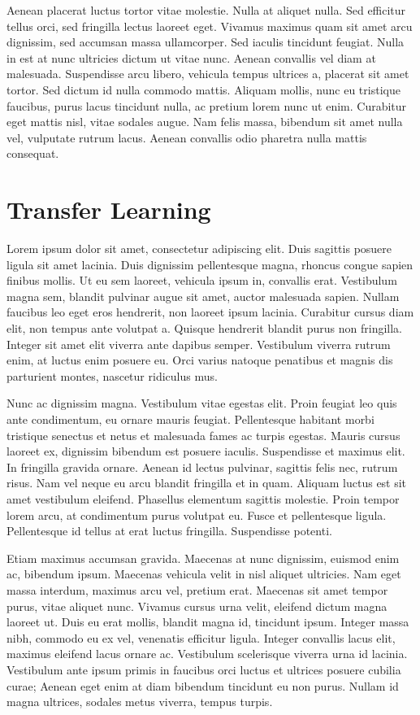 \documentclass[
  letterpaper,
  DIV=11,
  numbers=noendperiod]{scrreprt}
\begin{document}
Aenean placerat luctus tortor vitae molestie. Nulla at aliquet nulla.
Sed efficitur tellus orci, sed fringilla lectus laoreet eget. Vivamus
maximus quam sit amet arcu dignissim, sed accumsan massa ullamcorper.
Sed iaculis tincidunt feugiat. Nulla in est at nunc ultricies dictum ut
vitae nunc. Aenean convallis vel diam at malesuada. Suspendisse arcu
libero, vehicula tempus ultrices a, placerat sit amet tortor. Sed dictum
id nulla commodo mattis. Aliquam mollis, nunc eu tristique faucibus,
purus lacus tincidunt nulla, ac pretium lorem nunc ut enim. Curabitur
eget mattis nisl, vitae sodales augue. Nam felis massa, bibendum sit
amet nulla vel, vulputate rutrum lacus. Aenean convallis odio pharetra
nulla mattis consequat.


\chapter{Transfer Learning}\label{transfer-learning}

Lorem ipsum dolor sit amet, consectetur adipiscing elit. Duis sagittis
posuere ligula sit amet lacinia. Duis dignissim pellentesque magna,
rhoncus congue sapien finibus mollis. Ut eu sem laoreet, vehicula ipsum
in, convallis erat. Vestibulum magna sem, blandit pulvinar augue sit
amet, auctor malesuada sapien. Nullam faucibus leo eget eros hendrerit,
non laoreet ipsum lacinia. Curabitur cursus diam elit, non tempus ante
volutpat a. Quisque hendrerit blandit purus non fringilla. Integer sit
amet elit viverra ante dapibus semper. Vestibulum viverra rutrum enim,
at luctus enim posuere eu. Orci varius natoque penatibus et magnis dis
parturient montes, nascetur ridiculus mus.

Nunc ac dignissim magna. Vestibulum vitae egestas elit. Proin feugiat
leo quis ante condimentum, eu ornare mauris feugiat. Pellentesque
habitant morbi tristique senectus et netus et malesuada fames ac turpis
egestas. Mauris cursus laoreet ex, dignissim bibendum est posuere
iaculis. Suspendisse et maximus elit. In fringilla gravida ornare.
Aenean id lectus pulvinar, sagittis felis nec, rutrum risus. Nam vel
neque eu arcu blandit fringilla et in quam. Aliquam luctus est sit amet
vestibulum eleifend. Phasellus elementum sagittis molestie. Proin tempor
lorem arcu, at condimentum purus volutpat eu. Fusce et pellentesque
ligula. Pellentesque id tellus at erat luctus fringilla. Suspendisse
potenti.

Etiam maximus accumsan gravida. Maecenas at nunc dignissim, euismod enim
ac, bibendum ipsum. Maecenas vehicula velit in nisl aliquet ultricies.
Nam eget massa interdum, maximus arcu vel, pretium erat. Maecenas sit
amet tempor purus, vitae aliquet nunc. Vivamus cursus urna velit,
eleifend dictum magna laoreet ut. Duis eu erat mollis, blandit magna id,
tincidunt ipsum. Integer massa nibh, commodo eu ex vel, venenatis
efficitur ligula. Integer convallis lacus elit, maximus eleifend lacus
ornare ac. Vestibulum scelerisque viverra urna id lacinia. Vestibulum
ante ipsum primis in faucibus orci luctus et ultrices posuere cubilia
curae; Aenean eget enim at diam bibendum tincidunt eu non purus. Nullam
id magna ultrices, sodales metus viverra, tempus turpis.
\end{document}
